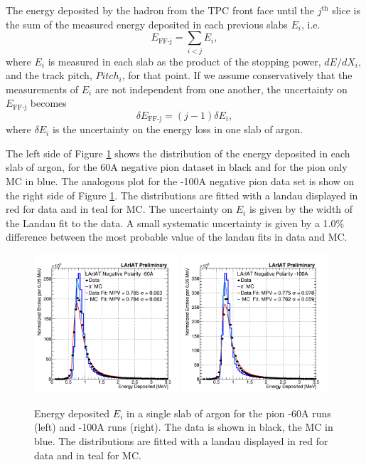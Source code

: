 The energy deposited by the hadron from the TPC front face until the $j^{\text{th}}$ slice is the sum of the measured energy deposited in each previous slabs $E_{i}$, i.e.
\begin{equation}
E_{\text{FF-j}} = \sum_{i<j} E_{i}, 
\end{equation}
where $E_{i}$ is measured in each slab as  the product of the stopping power,  $dE/dX_{i}$,  and the track pitch, $Pitch_i$, for that point. 
If we assume conservatively that the measurements of $E_{i}$ are not independent from one another, the uncertainty on $E_{\text{FF-j}}$ becomes
\begin{equation}
\delta E_{\text{FF-j}} = (j-1) \delta E_{i}, 
\end{equation}
where $\delta E_{i}$ is the uncertainty on the energy loss in one slab of argon.

The left side of Figure \ref{fig:EnergyDeposited} shows the distribution of the energy deposited in each slab of argon, for the 60A negative pion dataset in black and for the pion only MC in blue. The analogous plot for the -100A negative pion data set  is show on the right side of Figure \ref{fig:EnergyDeposited}.  The distributions are fitted with a landau displayed in red for data and in teal for MC.
The uncertainty on $E_{i}$ is given by the width of the Landau fit to the data. A small systematic uncertainty  is given by a 1.0\% difference between the most probable value of the landau fits in data and MC.

\begin{figure}[htb]
\centering
\includegraphics[width=0.48\textwidth]{Chapter-5/Images/DepEnergy_Fit_v4.png}
\includegraphics[width=0.48\textwidth]{Chapter-5/Images/DepEnergy_Fit_v4100A.png}
\caption[]{ Energy deposited  $E_{i}$ in a single slab of argon for the pion -60A runs (left) and -100A runs (right).  The data is shown in black, the MC in blue. The distributions are fitted with a landau displayed in red for data and in teal for MC. } \label{fig:EnergyDeposited}
\end{figure}


